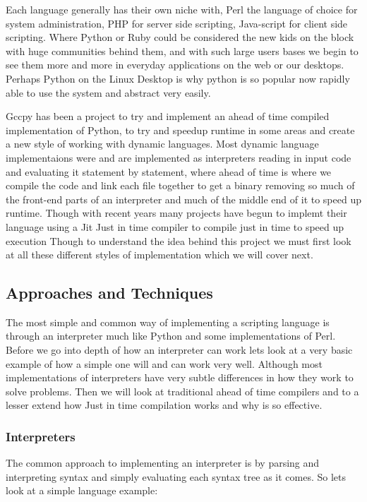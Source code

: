 \documentclass[defaultstyle,11pt]{article}
\begin{document}
Each language generally has their own niche with, Perl the language of choice for system administration,
PHP for server side scripting, Java-script for client side scripting. Where Python or Ruby could be considered
the new kids on the block with huge communities behind them, and with such large users bases we begin to see
them more and more in everyday applications on the web or our desktops. Perhaps Python on the Linux Desktop
is why python is so popular now rapidly able to use the system and abstract very easily.

Gccpy has been a project to try and implement an ahead of time compiled implementation of Python, to try and
speedup runtime in some areas and create a new style of working with dynamic languages. Most dynamic language implementaions
were and are implemented as interpreters reading in input code and evaluating it statement by statement, where ahead of time
is where we compile the code and link each file together to get a binary removing so much of the front-end parts of an interpreter
and much of the middle end of it to speed up runtime. Though with recent years many projects have begun to implemt their language
using a Jit Just in time compiler to compile just in time to speed up execution Though to understand the idea behind this project
we must first look at all these different styles of implementation which we will cover next.


\subsection{Approaches and Techniques}

The most simple and common way of implementing a scripting language is through an interpreter much like Python
and some implementations of Perl. Before we go into depth of how an interpreter can work lets look at a very basic example of how a simple one
will and can work very well. Although most implementations of interpreters have very subtle differences in how they work to
solve problems. Then we will look at traditional ahead of time compilers and to a lesser extend how Just in time compilation works and why is so effective.

\subsubsection{Interpreters}

The common approach to implementing an interpreter is by parsing and interpreting syntax and simply evaluating each syntax
tree as it comes. So lets look at a simple language example:
\end{document}
